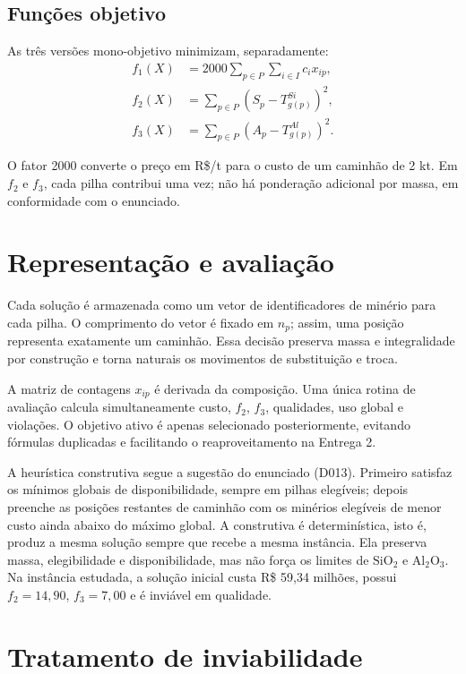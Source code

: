\documentclass[10pt,twocolumn,a4paper]{article}
\begin{document}
\subsection{Funções objetivo}

As três versões mono-objetivo minimizam, separadamente:
\begin{align}
f_1(X) &= 2000 \sum_{p \in P} \sum_{i \in I} c_i x_{ip}, \\
f_2(X) &= \sum_{p \in P} \left( S_p - T_{g(p)}^{Si} \right)^2, \\
f_3(X) &= \sum_{p \in P} \left( A_p - T_{g(p)}^{Al} \right)^2.
\end{align}

O fator 2000 converte o preço em R\$/t para o custo de um caminhão de 2 kt. Em $f_2$ e $f_3$, cada pilha contribui uma vez; não há ponderação adicional por massa, em conformidade com o enunciado.

\section{Representação e avaliação}

Cada solução é armazenada como um vetor de identificadores de minério para cada pilha. O comprimento do vetor é fixado em $n_p$; assim, uma posição representa exatamente um caminhão. Essa decisão preserva massa e integralidade por construção e torna naturais os movimentos de substituição e troca.

A matriz de contagens $x_{ip}$ é derivada da composição. Uma única rotina de avaliação calcula simultaneamente custo, $f_2$, $f_3$, qualidades, uso global e violações. O objetivo ativo é apenas selecionado posteriormente, evitando fórmulas duplicadas e facilitando o reaproveitamento na Entrega 2.

A heurística construtiva segue a sugestão do enunciado (D013). Primeiro satisfaz os mínimos globais de disponibilidade, sempre em pilhas elegíveis; depois preenche as posições restantes de caminhão com os minérios elegíveis de menor custo ainda abaixo do máximo global. A construtiva é determinística, isto é, produz a mesma solução sempre que recebe a mesma instância. Ela preserva massa, elegibilidade e disponibilidade, mas não força os limites de $\text{SiO}_2$ e $\text{Al}_2\text{O}_3$. Na instância estudada, a solução inicial custa R\$ 59,34 milhões, possui $f_2 = 14,90$, $f_3 = 7,00$ e é inviável em qualidade.

\section{Tratamento de inviabilidade}
\end{document}
